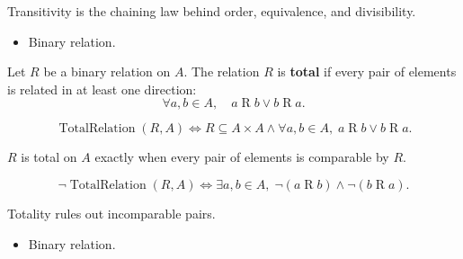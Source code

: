 \begin{remark*}[Interpretation]
Transitivity is the chaining law behind order, equivalence, and divisibility.
\end{remark*}

\begin{remark*}[Dependencies]
\begin{itemize}
  \item Binary relation.
\end{itemize}
\end{remark*}

\begin{definition}
\label{def:rel-total}
Let $R$ be a binary relation on $A$.
The relation $R$ is \textbf{total} if every pair of elements is related in at
least one direction:
\[
\forall a,b \in A,\quad
a \mathrel{R} b \lor b \mathrel{R} a.
\]
\end{definition}

\begin{remark*}
\[
\operatorname{TotalRelation}(R,A)
\Longleftrightarrow
R\subseteq A\times A
\land
\forall a,b\in A,\; a\mathrel{R}b \lor b\mathrel{R}a.
\]
\end{remark*}

\begin{remark*}
$R$ is total on $A$ exactly when every pair of elements is comparable by $R$.
\end{remark*}

\begin{remark*}
\[
\neg\operatorname{TotalRelation}(R,A)
\Longleftrightarrow
\exists a,b\in A,\; \lnot(a\mathrel{R}b) \land \lnot(b\mathrel{R}a).
\]
\end{remark*}

\begin{remark*}[Interpretation]
Totality rules out incomparable pairs.
\end{remark*}

\begin{remark*}[Dependencies]
\begin{itemize}
  \item Binary relation.
\end{itemize}
\end{remark*}
